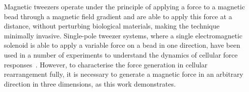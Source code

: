 Magnetic tweezers operate under the principle of applying a force to a magnetic bead through a magnetic field gradient and are able to apply this force at a distance, without perturbing biological materials, making the technique minimally invasive.
Single-pole tweezer systems, where a single electromagnetic solenoid is able to apply a variable force on a bead in one direction, have been used in a number of experiments to understand the dynamics of cellular force responses~\cite{}.
However, to characterise the force generation in cellular rearrangement fully, it is necessary to generate a magnetic force in an arbitrary direction in three dimensions, as this work demonstrates.
%
%


